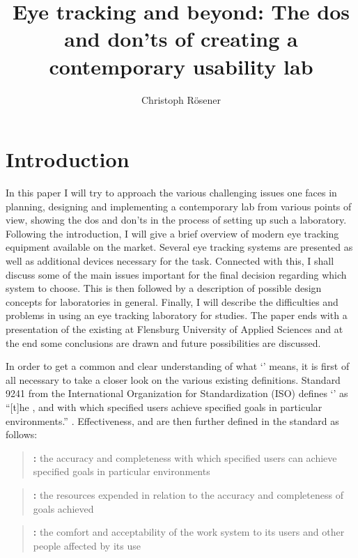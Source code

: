 \documentclass[output=paper]{langsci/langscibook}
\author{%
 Christoph Rösener
\affiliation{Johannes Gutenberg University of Mainz/Germersheim}
}
\title{Eye tracking and beyond: The dos and don'ts of creating a contemporary usability lab}
\begin{document}
\section{Introduction}

In this paper I will try to approach the various challenging issues one faces in planning, designing and implementing a contemporary  lab from various points of view, showing the dos and don'ts in the process of setting up such a laboratory. Following the introduction, I will give a brief overview of modern eye tracking equipment available on the market. Several eye tracking systems are presented as well as additional devices necessary for the task. Connected with this, I shall discuss some of the main issues important for the final decision regarding which system to choose. This is then followed by a description of possible design concepts for  laboratories in general. Finally, I will describe the difficulties and problems in using an eye tracking laboratory for  studies. The paper ends with a presentation of the existing  at Flensburg University of Applied Sciences and at the end some conclusions are drawn and future possibilities are discussed.


In order to get a common and clear understanding of what `' means, it is first of all necessary to take a closer look on the various existing definitions. Standard 9241 from the International Organization for Standardization (ISO) defines `' as ``[t]he ,  and  with which specified users achieve specified goals in particular environments.'' \citep{ISO9241}. Effectiveness,  and  are then further defined in the standard as follows: 


\begin{quote}
\textbf{: }the accuracy and completeness with which specified users can achieve specified goals in particular environments
\end{quote}

\begin{quote}
\textbf{:} the resources expended in relation to the accuracy and completeness of goals achieved
\end{quote}

\begin{quote}
\textbf{:} the comfort and acceptability of the work system to its users and other people affected by its use
\end{quote}
\end{document}
